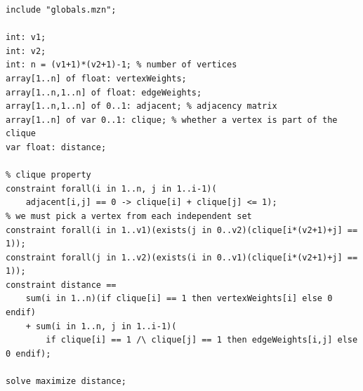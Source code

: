 \documentclass{article}
\theoremstyle{definition}
\begin{document}
\begin{lstlisting}
include "globals.mzn";

int: v1;
int: v2;
int: n = (v1+1)*(v2+1)-1; % number of vertices
array[1..n] of float: vertexWeights;
array[1..n,1..n] of float: edgeWeights;
array[1..n,1..n] of 0..1: adjacent; % adjacency matrix
array[1..n] of var 0..1: clique; % whether a vertex is part of the clique
var float: distance;

% clique property
constraint forall(i in 1..n, j in 1..i-1)(
    adjacent[i,j] == 0 -> clique[i] + clique[j] <= 1);
% we must pick a vertex from each independent set
constraint forall(i in 1..v1)(exists(j in 0..v2)(clique[i*(v2+1)+j] == 1));
constraint forall(j in 1..v2)(exists(i in 0..v1)(clique[i*(v2+1)+j] == 1));
constraint distance ==
    sum(i in 1..n)(if clique[i] == 1 then vertexWeights[i] else 0 endif)
    + sum(i in 1..n, j in 1..i-1)(
        if clique[i] == 1 /\ clique[j] == 1 then edgeWeights[i,j] else 0 endif);

solve maximize distance;
\end{lstlisting}
\end{document}
